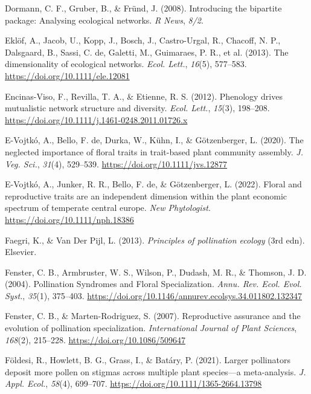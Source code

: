 \documentclass[
  12pt,
  a4paper,
]{article}
\newlength{\cslhangindent}
\newlength{\cslentryspacingunit} %
\newenvironment{CSLReferences}[2] %
 {%
  \setlength{\parindent}{0pt}
  \ifodd #1
  \let\oldpar\par
  \def\par{\hangindent=\cslhangindent\oldpar}
  \fi
  \setlength{\parskip}{#2\cslentryspacingunit}
 }%
 {}
\begin{document}
\begin{CSLReferences}{1}{0}
\leavevmode{}%
Dormann, C. F., Gruber, B., \& Fründ, J. (2008). Introducing the bipartite package: Analysing ecological networks. \emph{R News}, \emph{8/2}.

\leavevmode{}%
Eklöf, A., Jacob, U., Kopp, J., Bosch, J., Castro-Urgal, R., Chacoff, N. P., Dalsgaard, B., Sassi, C. de, Galetti, M., Guimaraes, P. R., et al. (2013). The dimensionality of ecological networks. \emph{Ecol. Lett.}, \emph{16}(5), 577--583. \url{https://doi.org/10.1111/ele.12081}

\leavevmode{}%
Encinas-Viso, F., Revilla, T. A., \& Etienne, R. S. (2012). Phenology drives mutualistic network structure and diversity. \emph{Ecol. Lett.}, \emph{15}(3), 198--208. \url{https://doi.org/10.1111/j.1461-0248.2011.01726.x}

\leavevmode{}%
E-Vojtkó, A., Bello, F. de, Durka, W., Kühn, I., \& Götzenberger, L. (2020). The neglected importance of floral traits in trait-based plant community assembly. \emph{J. Veg. Sci.}, \emph{31}(4), 529--539. \url{https://doi.org/10.1111/jvs.12877}

\leavevmode{}%
E-Vojtkó, A., Junker, R. R., Bello, F. de, \& Götzenberger, L. (2022). Floral and reproductive traits are an independent dimension within the plant economic spectrum of temperate central europe. \emph{New Phytologist}. \url{https://doi.org/10.1111/nph.18386}

\leavevmode{}%
Faegri, K., \& Van Der Pijl, L. (2013). \emph{Principles of pollination ecology} ({3rd edn}). {Elsevier}.

\leavevmode{}%
Fenster, C. B., Armbruster, W. S., Wilson, P., Dudash, M. R., \& Thomson, J. D. (2004). Pollination {Syndromes} and {Floral Specialization}. \emph{Annu. Rev. Ecol. Evol. Syst.}, \emph{35}(1), 375--403. \url{https://doi.org/10.1146/annurev.ecolsys.34.011802.132347}

\leavevmode{}%
Fenster, C. B., \& Marten-Rodriguez, S. (2007). Reproductive assurance and the evolution of pollination specialization. \emph{International Journal of Plant Sciences}, \emph{168}(2), 215--228. \url{https://doi.org/10.1086/509647}

\leavevmode{}%
Földesi, R., Howlett, B. G., Grass, I., \& Batáry, P. (2021). Larger pollinators deposit more pollen on stigmas across multiple plant species---a meta-analysis. \emph{J. Appl. Ecol.}, \emph{58}(4), 699--707. \url{https://doi.org/10.1111/1365-2664.13798}


\end{CSLReferences}
\end{document}
